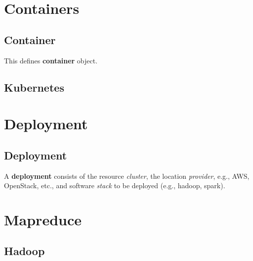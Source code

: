 \documentclass[9pt,twocolumn,twoside]{styles/osajnl}
\begin{document}

\section{Containers}

\subsection{Container}

This defines \textbf{container} object.


\subsection{Kubernetes}


\section{Deployment}

\subsection{Deployment}

A \textbf{deployment} consists of the resource \- \textit{cluster},
the location \- \textit{provider}, e.g., AWS, OpenStack, etc., and
software \textit{stack} to be deployed (e.g., hadoop, spark).


\section{Mapreduce}

\subsection{Hadoop}
\end{document}

